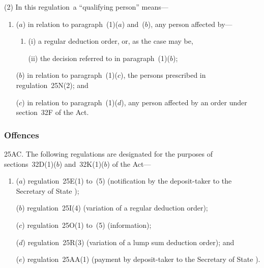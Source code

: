 \documentclass[12pt,a4paper]{article}
\begin{document}
(2) In this regulation~a “qualifying person” means—
\begin{enumerate}\item[]
($a$) in relation to paragraph~(1)($a$)  and~($b$), any person affected by—
\begin{enumerate}\item[]
(i) a regular deduction order, or, as the case may be,

(ii) the decision referred to in paragraph~(1)($b$);
\end{enumerate}

($b$) in relation to paragraph~(1)($c$), the persons prescribed in regulation~25N(2); and

($c$) in relation to paragraph~(1)($d$), any person affected by an order under section~32F of the Act.
\end{enumerate}


\subsubsection[25AC. Offences]{Offences}

25AC. The following regulations are designated for the purposes of sections~32D(1)($b$)  and~32K(1)($b$)  of the Act—
\begin{enumerate}\item[]
($a$) regulation~25E(1) to~(5) (notification by the deposit-taker to the 
Secretary of State%
);

($b$) regulation~25I(4) (variation of a regular deduction order);

($c$) regulation~25O(1) to~(5) (information);

($d$) regulation~25R(3) (variation of a lump sum deduction order); and

($e$) regulation~25AA(1) (payment by deposit-taker to the 
Secretary of State%
).
\end{enumerate}

\end{document}
